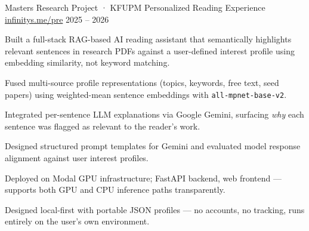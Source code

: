 

\begin{cventries}

  \cventry
    {Masters Research Project · KFUPM} %
    {Personalized Reading Experience} %
    {\href{https://infinitys.me/pre}{infinitys.me/pre}} %
    {2025 – 2026} %
    {
      \begin{cvitems}
        \item {Built a full-stack RAG-based AI reading assistant that semantically highlights relevant sentences in research PDFs against a user-defined interest profile using embedding similarity, not keyword matching.}
        \item {Fused multi-source profile representations (topics, keywords, free text, seed papers) using weighted-mean sentence embeddings with \texttt{all-mpnet-base-v2}.}
        \item {Integrated per-sentence LLM explanations via Google Gemini, surfacing \textit{why} each sentence was flagged as relevant to the reader's work.}
        \item {Designed structured prompt templates for Gemini and evaluated model response alignment against user interest profiles.}
        \item {Deployed on Modal GPU infrastructure; FastAPI backend, web frontend — supports both GPU and CPU inference paths transparently.}
        \item {Designed local-first with portable JSON profiles — no accounts, no tracking, runs entirely on the user's own environment.}
      \end{cvitems}
    }


\end{cventries}
